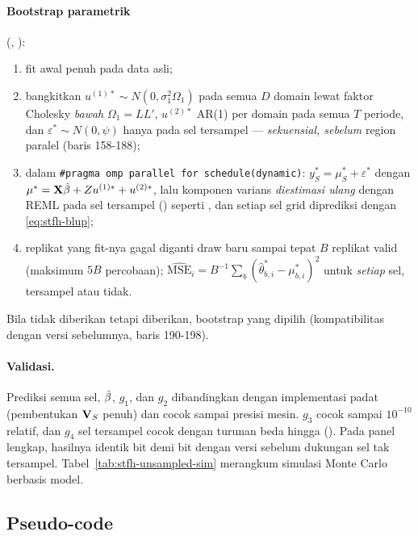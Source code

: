 \paragraph{Bootstrap parametrik} (,
):
\begin{enumerate}[label=\arabic*.]
  \item fit awal penuh pada data asli;
  \item bangkitkan $u^{(1)\ast}\sim N(0,\sigma_1^2\Omega_1)$ pada semua $D$
        domain lewat faktor Cholesky \emph{bawah} $\Omega_1=LL'$, $u^{(2)\ast}$
        AR(1) per domain pada semua $T$ periode, dan $\varepsilon^\ast\sim
        N(0,\psi)$ hanya pada sel tersampel --- \emph{sekuensial, sebelum}
        region paralel (baris 158-188);
  \item dalam \texttt{\#pragma omp parallel for schedule(dynamic)}:
        $y_S^\ast=\mu^\ast_S+\varepsilon^\ast$ dengan
        $\mu^\ast=\mathbf{X}\hat\beta+Zu^{(1)\ast}+u^{(2)\ast}$, lalu komponen
        varians \emph{diestimasi ulang} dengan REML pada sel tersampel
        () seperti , dan setiap
        sel grid diprediksi dengan \eqref{eq:stfh-blup};
  \item replikat yang fit-nya gagal diganti draw baru sampai tepat $B$
        replikat valid (maksimum $5B$ percobaan);
        $\widehat{\mathrm{MSE}}_i=B^{-1}\sum_b(\hat\theta_{b,i}^\ast-\mu_{b,i}^\ast)^2$
        untuk \emph{setiap} sel, tersampel atau tidak.
\end{enumerate}
Bila  tidak diberikan tetapi  diberikan, bootstrap
yang dipilih (kompatibilitas dengan versi sebelumnya, baris 190-198).

\paragraph{Validasi.} Prediksi semua sel, $\hat\beta$, $g_1$, dan $g_2$
dibandingkan dengan implementasi padat (pembentukan $\mathbf{V}_S$ penuh) dan
cocok sampai presisi mesin. $g_3$ cocok sampai $10^{-10}$ relatif, dan
$g_4$ sel tersampel cocok dengan turunan beda hingga
(). Pada panel lengkap,
hasilnya identik bit demi bit dengan versi sebelum dukungan sel tak tersampel.
Tabel~\ref{tab:stfh-unsampled-sim} merangkum simulasi Monte Carlo berbasis
model.



\subsection{Pseudo-code}\label{sec:stfh-algo}

